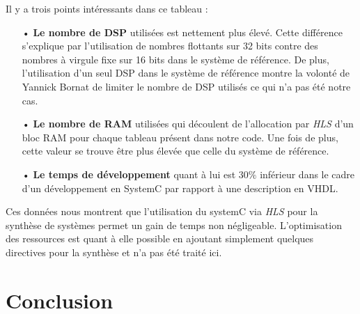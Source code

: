 \documentclass[a4paper,12pt]{article}
\begin{document}
	Il y a trois points intéressants dans ce tableau :
\begin{itemize}
	\item[•] \textbf{Le nombre de DSP} utilisées est nettement plus élevé. Cette différence s'explique par l'utilisation de nombres flottants sur 32 bits contre des nombres à virgule fixe sur 16 bits dans le système de référence. De plus, l'utilisation d'un seul DSP dans le système de référence montre la volonté de Yannick Bornat de limiter le nombre de DSP utilisés ce qui n'a pas été notre cas.
	\item[•] \textbf{Le nombre de RAM} utilisées qui découlent de l'allocation par \textit{HLS} d'un bloc RAM pour chaque tableau présent dans notre code. Une fois de plus, cette valeur se trouve être plus élevée que celle du système de référence.
	\item[•] \textbf{Le temps de développement} quant à lui est $30\%$ inférieur dans le cadre d'un développement en SystemC par rapport à une description en VHDL.
\end{itemize}

Ces données nous montrent que l'utilisation du systemC via \textit{HLS} pour la synthèse de systèmes permet un gain de temps non négligeable. L'optimisation des ressources est quant à elle possible en ajoutant simplement quelques directives pour la synthèse et n'a pas été traité ici. 
\newpage
\section{Conclusion}
\end{document}
